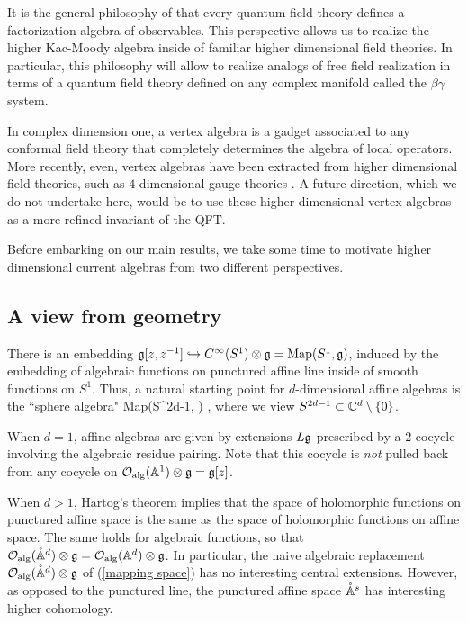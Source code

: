 It is the general philosophy of \cite{CG1,CG2} that every quantum field theory defines a factorization algebra of observables.
This perspective allows us to realize the higher Kac-Moody algebra inside of familiar higher dimensional field theories. 
In particular, this philosophy will allow to realize analogs of free field realization in terms of a quantum field theory defined on any complex manifold called the $\beta\gamma$ system. 

In complex dimension one, a vertex algebra is a gadget associated to any conformal field theory that completely determines the algebra of local operators.  
More recently, even, vertex algebras have been extracted from higher dimensional field theories, such as $4$-dimensional gauge theories \cite{Beem1,Beem2}. 
A future direction, which we do not undertake here, would be to use these higher dimensional vertex algebras as a more refined invariant of the QFT. 

Before embarking on our main results, we take some time to motivate higher dimensional current algebras from two different perspectives. 

\subsection*{A view from geometry}

There is an embedding $\mathfrak g[z,z^{-1}] \hookrightarrow C^\infty(S^1) \otimes \mathfrak g = {\rm Map}(S^1, \mathfrak g)$, induced by the embedding of algebraic functions on punctured affine line inside of smooth functions on $S^1$. 
Thus, a natural starting point for $d$-dimensional affine algebras is the ``sphere algebra" 
\beqn\label{mapping space}
{\rm Map}(S^{2d-1}, \fg) ,
\eeqn
where we view $S^{2d-1} \subset \mathbb C^d \setminus \{0\}$. 

When $d=1$, affine algebras are given by extensions $L\mathfrak g$ prescribed by a $2$-cocycle involving the algebraic residue pairing. 
Note that this cocycle is {\em not} pulled back from any cocycle on $\mathcal O_{\rm alg}(\mathbb A^1) \otimes \mathfrak g = \mathfrak g[z]$. 

When $d > 1$, Hartog's theorem implies that the space of holomorphic functions on punctured affine space is the same as the space of holomorphic functions on affine space.
The same holds for algebraic functions, so that $\mathcal O_{\rm alg}(\mathring{\mathbb A}^{d}) \otimes \mathfrak g = \mathcal O_{\rm alg}(\mathbb A^d) \otimes \mathfrak g$. 
In particular, the naive algebraic replacement $\mathcal O_{\rm alg}(\mathring{\mathbb A}^{d}) \otimes \mathfrak g$ of (\ref{mapping space}) has no interesting central extensions. 
However, as opposed to the punctured line, the punctured affine space $\mathring{\mathbb A}^{s}$ has interesting higher cohomology. 

